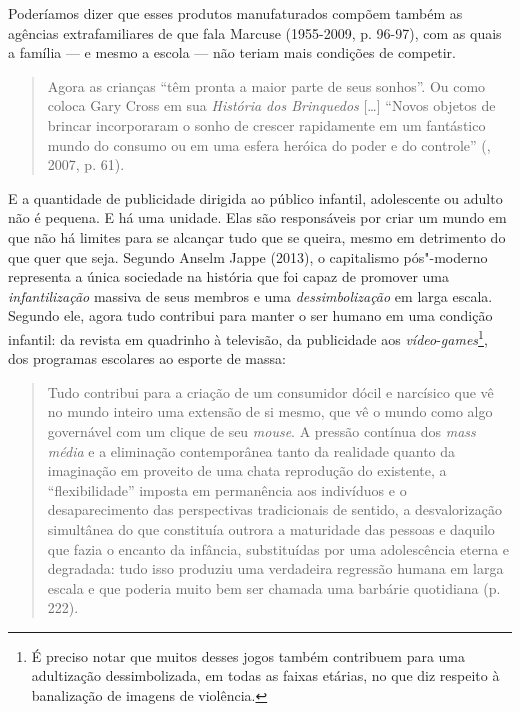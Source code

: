 Poderíamos dizer que esses produtos manufaturados compõem também as
agências extrafamiliares de que fala Marcuse (1955-2009, p. 96-97), com
as quais a família --- e mesmo a escola --- não teriam mais condições de
competir.

\begin{quote}
Agora as crianças ``têm pronta a maior parte de seus sonhos''. Ou como
coloca Gary Cross em sua \emph{História dos Brinquedos} [\ldots{}] ``Novos objetos
de brincar incorporaram o sonho de crescer rapidamente em um fantástico
mundo do consumo ou em uma esfera heróica do poder e do controle''
(, 2007, p. 61).
\end{quote}

E a quantidade de publicidade dirigida ao público infantil, adolescente
ou adulto não é pequena. E há uma unidade. Elas são responsáveis por
criar um mundo em que não há limites para se alcançar tudo que se
queira, mesmo em detrimento do que quer que seja. Segundo Anselm Jappe
(2013), o capitalismo pós"-moderno representa a única sociedade na
história que foi capaz de promover uma \emph{infantilização} massiva de
seus membros e uma \emph{dessimbolização} em larga escala. Segundo ele,
agora tudo contribui para manter o ser humano em uma condição infantil:
da revista em quadrinho à televisão, da publicidade aos
\emph{vídeo}-\emph{games}\footnote{É preciso notar que muitos desses
  jogos também contribuem para uma adultização dessimbolizada, em todas
  as faixas etárias, no que diz respeito à banalização de imagens de
  violência.}, dos programas escolares ao esporte de massa:

\begin{quote}
Tudo contribui para a criação de um consumidor dócil e narcísico que vê
no mundo inteiro uma extensão de si mesmo, que vê o mundo como algo
governável com um clique de seu \emph{mouse}. A pressão contínua dos
\emph{mass média} e a eliminação contemporânea tanto da realidade quanto
da imaginação em proveito de uma chata reprodução do existente, a
``flexibilidade'' imposta em permanência aos indivíduos e o
desaparecimento das perspectivas tradicionais de sentido, a
desvalorização simultânea do que constituía outrora a maturidade das
pessoas e daquilo que fazia o encanto da infância, substituídas por uma
adolescência eterna e degradada: tudo isso produziu uma verdadeira
regressão humana em larga escala e que poderia muito bem ser chamada uma
barbárie quotidiana (p. 222).
\end{quote}

